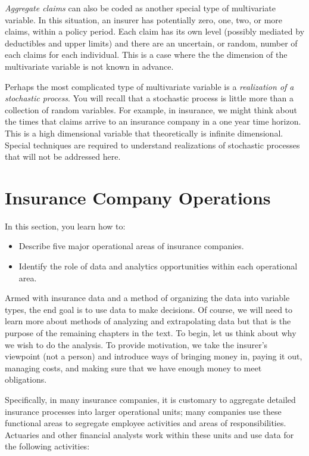 \documentclass[]{book}
\providecommand{\tightlist}{%
  \setlength{\itemsep}{0pt}\setlength{\parskip}{0pt}}
\theoremstyle{definition}
\theoremstyle{definition}
\theoremstyle{definition}
\theoremstyle{remark}
\begin{document}
\emph{Aggregate claims} can also be coded as another special type of
multivariate variable. In this situation, an insurer has potentially
zero, one, two, or more claims, within a policy period. Each claim has
its own level (possibly mediated by deductibles and upper limits) and
there are an uncertain, or random, number of each claims for each
individual. This is a case where the the dimension of the multivariate
variable is not known in advance.

Perhaps the most complicated type of multivariate variable is a
\emph{realization of a stochastic process}. You will recall that a
stochastic process is little more than a collection of random variables.
For example, in insurance, we might think about the times that claims
arrive to an insurance company in a one year time horizon. This is a
high dimensional variable that theoretically is infinite dimensional.
Special techniques are required to understand realizations of stochastic
processes that will not be addressed here.

\section{Insurance Company Operations}\label{S:PredModApps}

In this section, you learn how to:

\begin{itemize}
\tightlist
\item
  Describe five major operational areas of insurance companies.
\item
  Identify the role of data and analytics opportunities within each
  operational area.
\end{itemize}

Armed with insurance data and a method of organizing the data into
variable types, the end goal is to use data to make decisions. Of
course, we will need to learn more about methods of analyzing and
extrapolating data but that is the purpose of the remaining chapters in
the text. To begin, let us think about why we wish to do the analysis.
To provide motivation, we take the insurer's viewpoint (not a person)
and introduce ways of bringing money in, paying it out, managing costs,
and making sure that we have enough money to meet obligations.

Specifically, in many insurance companies, it is customary to aggregate
detailed insurance processes into larger operational units; many
companies use these functional areas to segregate employee activities
and areas of responsibilities. Actuaries and other financial analysts
work within these units and use data for the following activities:
\end{document}

